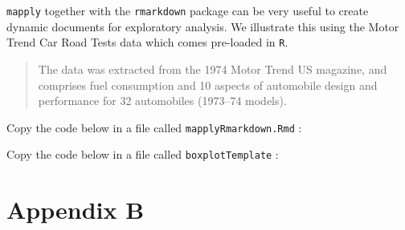 \documentclass[]{book}
\theoremstyle{definition}
\theoremstyle{definition}
\theoremstyle{definition}
\theoremstyle{remark}
\begin{document}
\texttt{mapply} together with the \texttt{rmarkdown} package
\citep{R-rmarkdown} can be very useful to create dynamic documents for
exploratory analysis. We illustrate this using the Motor Trend Car Road
Tests data which comes pre-loaded in \texttt{R}.

\begin{quote}
The data was extracted from the 1974 Motor Trend US magazine, and
comprises fuel consumption and 10 aspects of automobile design and
performance for 32 automobiles (1973--74 models).
\end{quote}

Copy the code below in a file called \texttt{mapplyRmarkdown.Rmd} :

Copy the code below in a file called \texttt{boxplotTemplate} :

\chapter{Appendix B}\label{appendix-b}


\end{document}
